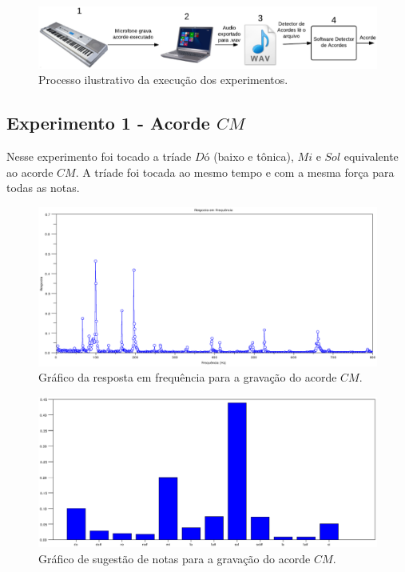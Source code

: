 \begin{figure}[h]
	\centering
		\includegraphics[keepaspectratio=true,scale=0.35]{figuras/processo_experimento.eps}
	\caption{Processo ilustrativo da execução dos experimentos.}
  \label{fig:processo}
\end{figure}


\subsection{Experimento 1 - Acorde $CM$}
\label{sec:experimento1}

Nesse experimento foi tocado a tríade $Dó$ (baixo e tônica), $Mi$ e $Sol$ equivalente ao acorde $CM$. A tríade foi tocada ao mesmo tempo e com a mesma força para todas as notas.

\begin{figure}[h]
	\centering
		\includegraphics[keepaspectratio=true,scale=0.49]{figuras/CM/fft_cm.eps}
	\caption{Gráfico da resposta em frequência para a gravação do acorde $CM$.}
  \label{fig:espectro_CM}
\end{figure}

\begin{figure}[h]
	\centering
		\includegraphics[keepaspectratio=true,scale=0.49]{figuras/CM/notas_cm.eps}
	\caption{Gráfico de sugestão de notas para a gravação do acorde $CM$.}
  \label{fig:notas_CM}
\end{figure}


